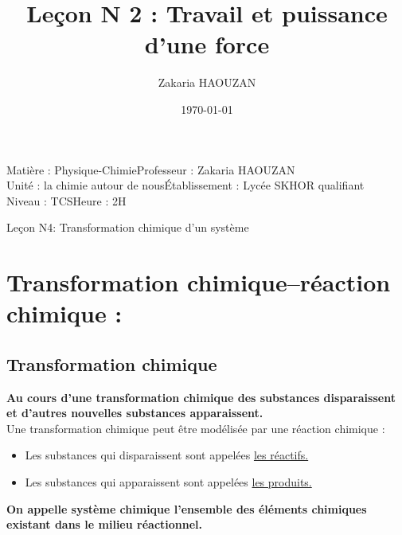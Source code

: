 \documentclass[12pt]{article}
\title{Leçon N 2 : Travail et puissance d’une force }
\author{Zakaria HAOUZAN}
\date{\today}
\newcommand\headerMe[2]{\noindent{}#1\hfill#2}
\begin{document}
\headerMe{Matière : Physique-Chimie}{Professeur : Zakaria HAOUZAN}\\
\headerMe{Unité : la chimie autour de nous}{Établissement : Lycée SKHOR qualifiant}\\
\headerMe{Niveau : TCS}{Heure : 2H}\\

\begin{center}

    \Large{Leçon N4: \color{red}Transformation chimique d’un système }
\end{center}

\section{ Transformation chimique–réaction chimique :}
    \subsection{Transformation chimique}
        \textbf{Au cours d’une transformation chimique des substances disparaissent et d’autres nouvelles substances apparaissent.}\\
Une transformation chimique peut être modélisée par une réaction chimique :
\begin{itemize}
    \item Les substances qui disparaissent sont appelées \underline {les réactifs.}
    \item Les substances qui apparaissent sont appelées \underline{les produits.}
\end{itemize}
\textbf{On appelle système chimique l’ensemble des éléments chimiques existant dans le milieu réactionnel.}
\end{document}
